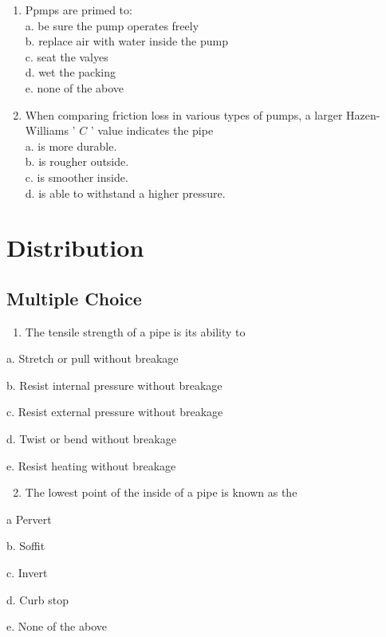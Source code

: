 \documentclass[10pt]{article}
\begin{document}
\begin{enumerate}
\begin{enumerate}
\begin{enumerate}
  \item Ppmps are primed to:\\
a. be sure the pump operates freely\\
b. replace air with water inside the pump\\
c. seat the valyes\\
d. wet the packing\\
e. none of the above

  \item When comparing friction loss in various types of pumps, a larger Hazen-Williams ' $C$ ' value indicates the pipe\\
a. is more durable.\\
b. is rougher outside.\\
c. is smoother inside.\\
d. is able to withstand a higher pressure.

\end{enumerate}

\newpage
\section{Distribution}
\subsection{Multiple Choice}
\begin{enumerate}
  \item The tensile strength of a pipe is its ability to
\end{enumerate}

a. Stretch or pull without breakage

b. Resist internal pressure without breakage

c. Resist external pressure without breakage

d. Twist or bend without breakage

e. Resist heating without breakage

\begin{enumerate}
  \setcounter{enumi}{1}
  \item The lowest point of the inside of a pipe is known as the
\end{enumerate}

a Pervert

b. Soffit

c. Invert

d. Curb stop

e. None of the above


\end{enumerate}
\end{enumerate}
\end{document}
